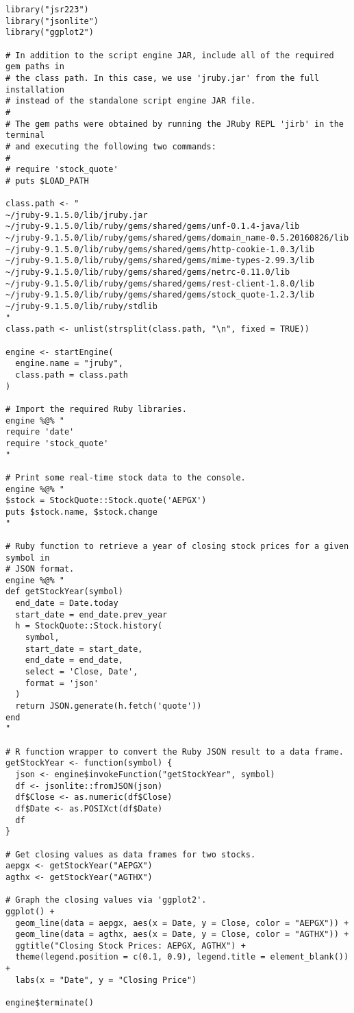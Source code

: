 \begin{verbatim}
library("jsr223")
library("jsonlite")
library("ggplot2")

# In addition to the script engine JAR, include all of the required gem paths in
# the class path. In this case, we use 'jruby.jar' from the full installation 
# instead of the standalone script engine JAR file.
# 
# The gem paths were obtained by running the JRuby REPL 'jirb' in the terminal
# and executing the following two commands:
# 
# require 'stock_quote'
# puts $LOAD_PATH

class.path <- "
~/jruby-9.1.5.0/lib/jruby.jar
~/jruby-9.1.5.0/lib/ruby/gems/shared/gems/unf-0.1.4-java/lib
~/jruby-9.1.5.0/lib/ruby/gems/shared/gems/domain_name-0.5.20160826/lib
~/jruby-9.1.5.0/lib/ruby/gems/shared/gems/http-cookie-1.0.3/lib
~/jruby-9.1.5.0/lib/ruby/gems/shared/gems/mime-types-2.99.3/lib
~/jruby-9.1.5.0/lib/ruby/gems/shared/gems/netrc-0.11.0/lib
~/jruby-9.1.5.0/lib/ruby/gems/shared/gems/rest-client-1.8.0/lib
~/jruby-9.1.5.0/lib/ruby/gems/shared/gems/stock_quote-1.2.3/lib
~/jruby-9.1.5.0/lib/ruby/stdlib
"
class.path <- unlist(strsplit(class.path, "\n", fixed = TRUE))

engine <- startEngine(
  engine.name = "jruby",
  class.path = class.path
)

# Import the required Ruby libraries.
engine %@% "
require 'date'
require 'stock_quote'
"

# Print some real-time stock data to the console.
engine %@% "
$stock = StockQuote::Stock.quote('AEPGX')
puts $stock.name, $stock.change
"

# Ruby function to retrieve a year of closing stock prices for a given symbol in
# JSON format.
engine %@% "
def getStockYear(symbol)
  end_date = Date.today
  start_date = end_date.prev_year
  h = StockQuote::Stock.history(
    symbol,
    start_date = start_date,
    end_date = end_date,
    select = 'Close, Date',
    format = 'json'
  )
  return JSON.generate(h.fetch('quote'))
end
"

# R function wrapper to convert the Ruby JSON result to a data frame.
getStockYear <- function(symbol) {
  json <- engine$invokeFunction("getStockYear", symbol)
  df <- jsonlite::fromJSON(json)
  df$Close <- as.numeric(df$Close)
  df$Date <- as.POSIXct(df$Date)
  df
}

# Get closing values as data frames for two stocks.
aepgx <- getStockYear("AEPGX")
agthx <- getStockYear("AGTHX")

# Graph the closing values via 'ggplot2'.
ggplot() +
  geom_line(data = aepgx, aes(x = Date, y = Close, color = "AEPGX")) +
  geom_line(data = agthx, aes(x = Date, y = Close, color = "AGTHX")) +
  ggtitle("Closing Stock Prices: AEPGX, AGTHX") +
  theme(legend.position = c(0.1, 0.9), legend.title = element_blank()) +
  labs(x = "Date", y = "Closing Price")

engine$terminate()
\end{verbatim}

